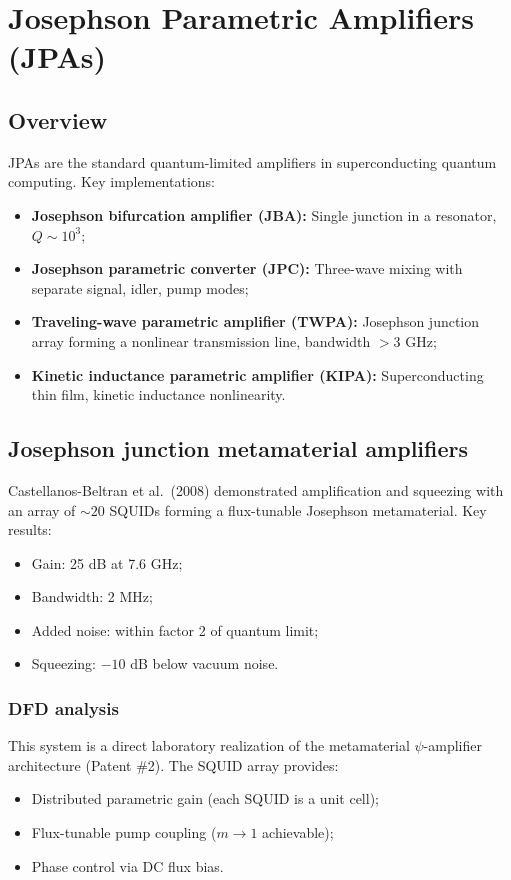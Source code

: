 \documentclass[12pt,letterpaper]{article}
\begin{document}
\section{Josephson Parametric Amplifiers (JPAs)}

\subsection{Overview}

JPAs are the standard quantum-limited amplifiers in superconducting
quantum computing.  Key implementations:
\begin{itemize}[noitemsep]
  \item \textbf{Josephson bifurcation amplifier (JBA):} Single junction
    in a resonator, $Q \sim 10^3$;
  \item \textbf{Josephson parametric converter (JPC):} Three-wave
    mixing with separate signal, idler, pump modes;
  \item \textbf{Traveling-wave parametric amplifier (TWPA):} Josephson
    junction array forming a nonlinear transmission line, bandwidth
    $> 3$ GHz;
  \item \textbf{Kinetic inductance parametric amplifier (KIPA):}
    Superconducting thin film, kinetic inductance nonlinearity.
\end{itemize}

\subsection{Josephson junction metamaterial amplifiers}

Castellanos-Beltran et al.\ (2008) demonstrated amplification and
squeezing with an array of $\sim 20$ SQUIDs forming a flux-tunable
Josephson metamaterial.  Key results:
\begin{itemize}[noitemsep]
  \item Gain: 25 dB at 7.6 GHz;
  \item Bandwidth: 2 MHz;
  \item Added noise: within factor 2 of quantum limit;
  \item Squeezing: $-10$ dB below vacuum noise.
\end{itemize}

\subsubsection{DFD analysis}

This system is a direct laboratory realization of the metamaterial
$\psi$-amplifier architecture (Patent \#2).  The SQUID array provides:
\begin{itemize}[noitemsep]
  \item Distributed parametric gain (each SQUID is a unit cell);
  \item Flux-tunable pump coupling ($m \to 1$ achievable);
  \item Phase control via DC flux bias.
\end{itemize}
\end{document}
